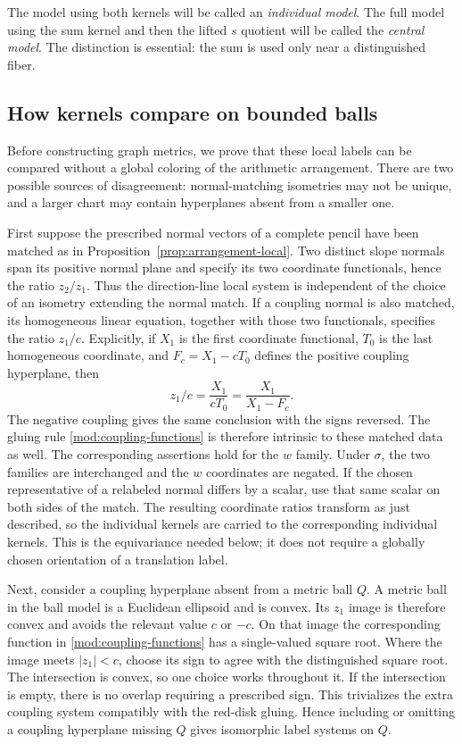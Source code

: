 \documentclass[11pt,reqno]{amsart}
\numberwithin{equation}{section}
\theoremstyle{definition}
\theoremstyle{remark}
\begin{document}
The model using both kernels will be called an \emph{individual
model}.  The full model using the sum kernel and then the lifted
$s$ quotient will be called the \emph{central model}.  The distinction
is essential: the sum is used only near a distinguished fiber.

\subsection{How kernels compare on bounded balls}

Before constructing graph metrics, we prove that these local labels
can be compared without a global coloring of the arithmetic
arrangement.  There are two possible sources of disagreement:
normal-matching isometries may not be unique, and a larger chart
may contain hyperplanes absent from a smaller one.

First suppose the prescribed normal vectors of a complete pencil
have been matched as in Proposition~\ref{prop:arrangement-local}.
Two distinct slope normals span its positive
normal plane and specify its two coordinate functionals, hence the
ratio $z_2/z_1$.  Thus the direction-line local system is independent
of the choice of an isometry extending the normal match.  If a
coupling normal is also matched, its homogeneous linear equation,
together with those two functionals, specifies the ratio $z_1/c$.
Explicitly, if $X_1$ is the first coordinate functional, $T_0$ is
the last homogeneous coordinate, and $F_c=X_1-cT_0$ defines the
positive coupling hyperplane, then
\[
 z_1/c=\frac{X_1}{cT_0}=\frac{X_1}{X_1-F_c}.
\]
The negative coupling gives the same conclusion with the signs reversed.
The gluing rule \eqref{mod:coupling-functions} is therefore intrinsic
to these matched data as well.  The corresponding assertions hold
for the $w$ family.  Under $\sigma$, the two families are interchanged
and the $w$ coordinates are negated.  If the chosen representative
of a relabeled normal differs by a scalar, use that same scalar on
both sides of the match.  The resulting coordinate ratios transform
as just described, so the individual kernels are carried to the
corresponding individual kernels.  This is the equivariance needed
below; it does not require a globally chosen orientation of a
translation label.

Next, consider a coupling hyperplane absent from a metric ball $Q$.
A metric ball in the ball model is a Euclidean ellipsoid and is
convex.  Its $z_1$ image is therefore convex and avoids the relevant
value $c$ or $-c$.  On that image the corresponding function in
\eqref{mod:coupling-functions} has a single-valued square root.
Where the image meets $|z_1|<c$, choose its sign to agree with the
distinguished square root.  The intersection is convex, so one
choice works throughout it.  If the intersection is empty, there
is no overlap requiring a prescribed sign.  This trivializes the
extra coupling system compatibly with the red-disk gluing.  Hence
including or omitting a coupling hyperplane missing $Q$ gives
isomorphic label systems on $Q$.
\end{document}
